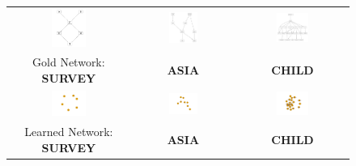 \documentclass[runningheads]{llncs}
\begin{document}
\newpage

\begin{figure}[H]
	\centering
	\begin{tabular}{ccc}
		\includegraphics[width=0.3\textwidth]{IMG/G5.png} &
		\includegraphics[width=0.3\textwidth]{IMG/G1.png} &
		\includegraphics[width=0.3\textwidth]{IMG/G6.png} \\
		Gold Network: \textbf{SURVEY} & \textbf{ASIA} & \textbf{CHILD} \\
		\includegraphics[width=0.3\textwidth]{IMG/1gr.png} &
		\includegraphics[width=0.3\textwidth]{IMG/2gr.png} &
		\includegraphics[width=0.3\textwidth]{IMG/3gr.png} \\
		Learned Network: \textbf{SURVEY} & \textbf{ASIA} & \textbf{CHILD} \\
		

\end{tabular}
\end{figure}
\end{document}
